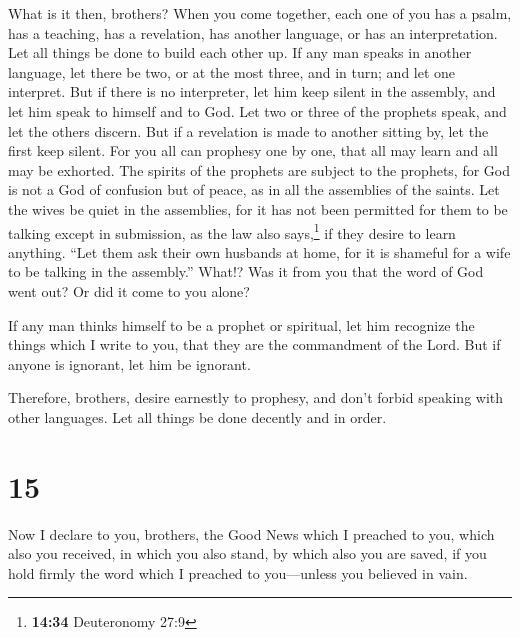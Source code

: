  What is it then, brothers? When you come together, each
one of you has a psalm, has a teaching, has a revelation, has another
language, or has an interpretation. Let all things be done to build each
other up.  If any man speaks in another language, let
there be two, or at the most three, and in turn; and let one interpret.
 But if there is no interpreter, let him keep silent in
the assembly, and let him speak to himself and to God. 
Let two or three of the prophets speak, and let the others discern.
 But if a revelation is made to another sitting by, let
the first keep silent.  For you all can prophesy one by
one, that all may learn and all may be exhorted.  The
spirits of the prophets are subject to the prophets,  for
God is not a God of confusion but of peace, as in all the assemblies of
the saints.  Let the wives be quiet in the assemblies,
for it has not been permitted for them to be talking except in
submission, as the law also says,\footnote{\textbf{14:34} Deuteronomy
  27:9}  if they desire to learn anything. ``Let them ask
their own husbands at home, for it is shameful for a wife to be talking
in the assembly.''  What!? Was it from you that the word
of God went out? Or did it come to you alone?

 If any man thinks himself to be a prophet or spiritual,
let him recognize the things which I write to you, that they are the
commandment of the Lord.  But if anyone is ignorant, let
him be ignorant.

 Therefore, brothers, desire earnestly to prophesy, and
don't forbid speaking with other languages.  Let all
things be done decently and in order.

\hypertarget{section-14}{%
\section{15}\label{section-14}}

 Now I declare to you, brothers, the Good News which I
preached to you, which also you received, in which you also stand,
 by which also you are saved, if you hold firmly the word
which I preached to you---unless you believed in vain.

